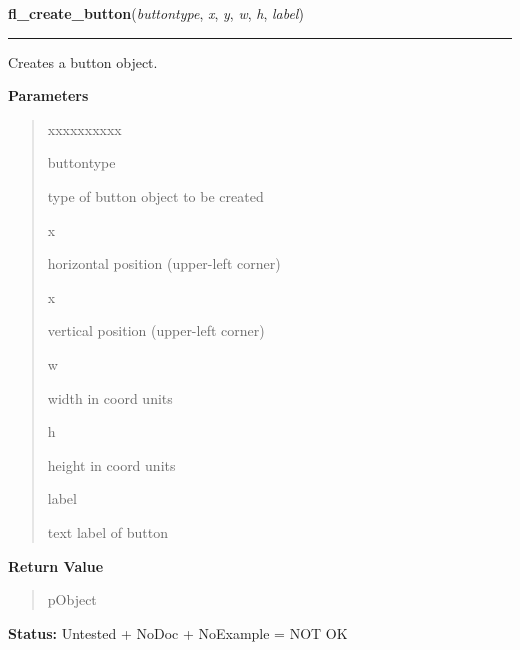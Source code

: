     \label{xformslib:library:fl_create_button}

    \vspace{0.5ex}

\hspace{.8\funcindent}\begin{boxedminipage}{\funcwidth}

    \raggedright \textbf{fl\_create\_button}(\textit{buttontype}, \textit{x}, \textit{y}, \textit{w}, \textit{h}, \textit{label})

    \vspace{-1.5ex}

    \rule{\textwidth}{0.5\fboxrule}
\setlength{\parskip}{2ex}
    Creates a button object.

\setlength{\parskip}{1ex}
      \textbf{Parameters}
      \vspace{-1ex}

      \begin{quote}
        \begin{Ventry}{xxxxxxxxxx}

          \item[buttontype]

          type of button object to be created

          \item[x]

          horizontal position (upper-left corner)

          \item[x]

          vertical position (upper-left corner)

          \item[w]

          width in coord units

          \item[h]

          height in coord units

          \item[label]

          text label of button

        \end{Ventry}

      \end{quote}

      \textbf{Return Value}
    \vspace{-1ex}

      \begin{quote}
      pObject

      \end{quote}

\textbf{Status:} Untested + NoDoc + NoExample = NOT OK



    \end{boxedminipage}

